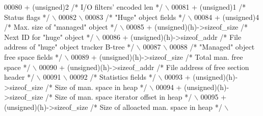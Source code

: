 \begin{DoxyCode}
00080 \textcolor{preprocessor}{    + (unsigned)2 }\textcolor{comment}{/* I/O filters' encoded len */}\textcolor{preprocessor}{                              \(\backslash\)}
00081 \textcolor{preprocessor}{    + (unsigned)1 }\textcolor{comment}{/* Status flags */}\textcolor{preprocessor}{                                          \(\backslash\)}
00082 \textcolor{preprocessor}{                                                                              \(\backslash\)}
00083 \textcolor{preprocessor}{    }\textcolor{comment}{/* "Huge" object fields */}\textcolor{preprocessor}{                                                \(\backslash\)}
00084 \textcolor{preprocessor}{    + (unsigned)4 }\textcolor{comment}{/* Max. size of "managed" object */}\textcolor{preprocessor}{                         \(\backslash\)}
00085 \textcolor{preprocessor}{    + (unsigned)(h)->sizeof\_size }\textcolor{comment}{/* Next ID for "huge" object */}\textcolor{preprocessor}{              \(\backslash\)}
00086 \textcolor{preprocessor}{    + (unsigned)(h)->sizeof\_addr }\textcolor{comment}{/* File address of "huge" object tracker B-tree  */}\textcolor{preprocessor}{    \(\backslash\)}
00087 \textcolor{preprocessor}{                                                                              \(\backslash\)}
00088 \textcolor{preprocessor}{    }\textcolor{comment}{/* "Managed" object free space fields */}\textcolor{preprocessor}{                                  \(\backslash\)}
00089 \textcolor{preprocessor}{    + (unsigned)(h)->sizeof\_size }\textcolor{comment}{/* Total man. free space */}\textcolor{preprocessor}{                  \(\backslash\)}
00090 \textcolor{preprocessor}{    + (unsigned)(h)->sizeof\_addr }\textcolor{comment}{/* File address of free section header */}\textcolor{preprocessor}{    \(\backslash\)}
00091 \textcolor{preprocessor}{                                                                              \(\backslash\)}
00092 \textcolor{preprocessor}{    }\textcolor{comment}{/* Statistics fields */}\textcolor{preprocessor}{                                                   \(\backslash\)}
00093 \textcolor{preprocessor}{    + (unsigned)(h)->sizeof\_size }\textcolor{comment}{/* Size of man. space in heap */}\textcolor{preprocessor}{             \(\backslash\)}
00094 \textcolor{preprocessor}{    + (unsigned)(h)->sizeof\_size }\textcolor{comment}{/* Size of man. space iterator offset in heap */}\textcolor{preprocessor}{ \(\backslash\)}
00095 \textcolor{preprocessor}{    + (unsigned)(h)->sizeof\_size }\textcolor{comment}{/* Size of alloacted man. space in heap */}\textcolor{preprocessor}{   \(\backslash\)}

\end{DoxyCode}
